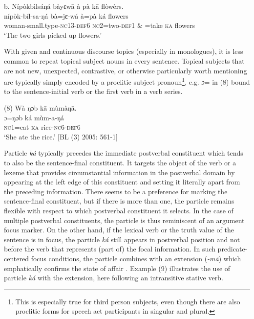 \documentclass[output=paper]{langsci/langscibook}
\begin{document}
\ea
\glll   \textup{b.}  Nípòkbìlsáŋá  bàyɛw\={a}  à  pà  k\={a}  flòwèrs.\\
     nípòk-bíl-sa-ŋá  bà=jɛ-wá  à=pà  ká  flowers\\
     woman-small.type-\textsc{nc}13-\textsc{def}6  \textsc{nc}2=two-\textsc{def}1  \& =take  \textsc{ka}  flowers\\
    ‘The two girls picked up flowers.’ \citep[271]{Schwarz2009}
\z

With given and continuous discourse topics (especially in monologues), it is less common to repeat topical subject nouns in every sentence. Topical subjects that are not new, unexpected, contrastive, or otherwise particularly worth mentioning are typically simply encoded by a proclitic subject pronoun\footnote{ This is especially true for third person subjects, even though there are also proclitic forms for speech act participants in singular and plural. }, e.g. \textit{ɔ}= in (8) bound to the sentence-initial verb or the first verb in a verb series. 

\ea
\glll \textup{(8)}  Wà ŋɔb  k\={a}  mùmàŋ\={a}.\\
  \textup{ɔ=ŋɔb    ká  mùm-a-ŋá}\\
     \textsc{nc1}=eat  \textsc{ka}  rice-\textsc{nc}6-\textsc{def}6\\
\glt ‘She ate the rice.’ [BL (3) 2005: 561-1]
\z

Particle \textit{ká }typically precedes the immediate postverbal constituent which tends to also be the sentence-final constituent. It targets the object of the verb or a lexeme that provides circumstantial information in the postverbal domain by appearing at the left edge of this constituent and setting it literally apart from the preceding information. There seems to be a preference for marking the sentence-final constituent, but if there is more than one, the particle remains flexible with respect to which postverbal constituent it selects. In the case of multiple postverbal constituents, the particle is thus reminiscent of an argument focus marker. On the other hand, if the lexical verb or the truth value of the sentence is in focus, the particle \textit{ká }still appears in postverbal position and not before the verb that represents (part of) the focal information. In such predicate-centered focus conditions, the particle combines with an extension (\textit{{}-m\={a}}) which emphatically confirms the state of affair \citep{Schwarz2010b}. Example (9) illustrates the use of particle \textit{ká }with the extension, here following an intransitive stative verb.
\end{document}
